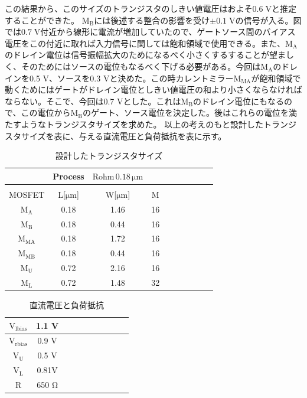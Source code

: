 \documentclass[twocolumn]{jsarticle}
\begin{document}
    この結果から、このサイズのトランジスタのしきい値電圧はおよそ$0.6\;\mathrm{V}$と推定することができた。
    $\mathrm{M_{B}}$には後述する整合の影響を受け$\pm0.1\;\mathrm{V}$の信号が入る。図では$0.7\;\mathrm{V}$付近から線形に電流が増加していたので、ゲートソース間のバイアス電圧をこの付近に取れば入力信号に関しては飽和領域で使用できる。また、$\mathrm{M_{A}}$のドレイン電位は信号振幅拡大のためになるべく小さくするすることが望ましく、そのためにはソースの電位もなるべく下げる必要がある。今回は$\mathrm{M_{A}}$のドレインを0.5 V、ソースを0.3 Vと決めた。この時カレントミラー$\mathrm{M_{MA}}$が飽和領域で動くためにはゲートがドレイン電位としきい値電圧の和より小さくならなければならない。そこで、今回は0.7 Vとした。これは$\mathrm{M_{B}}$のドレイン電位にもなるので、この電位から$\mathrm{M_{B}}$のゲート、ソース電位を決定した。後はこれらの電位を満たすようなトランジスタサイズを求めた。    以上の考えのもと設計したトランジスタサイズを表に、与える直流電圧と負荷抵抗を表に示す。
    \begin{table}[H]
    \caption{設計したトランジスタサイズ}
    \label{table:size}
    \centering
    \begin{tabular}{cccccccccc}
        \hline
        &Process&$\mathrm{Rohm\,0.18\,\mu m}$&\\
        \hline
        &&&\\
        MOSFET & L[$\mathrm{\mu m}$] & W[$\mathrm{\mu m}$] & M\\
        \hline \hline
        $\mathrm{M_{A}}$ & 0.18 & 1.46 & 16 \\
        $\mathrm{M_{B}}$ & 0.18 & 0.44 & 16 \\
        $\mathrm{M_{MA}}$& 0.18 & 1.72 & 16 \\
        $\mathrm{M_{MB}}$& 0.18 & 0.44 & 16 \\
        $\mathrm{M_{U}}$ & 0.72 & 2.16 & 16 \\
        $\mathrm{M_{L}}$ & 0.72 & 1.48 & 32 \\            
    \end{tabular}
    \end{table}
    \begin{table}[H]
    \caption{直流電圧と負荷抵抗}
    \label{table:bias}
    \centering
    \begin{tabular}{cccccccccc}
        $\mathrm{V_{lbias}}$ & 1.1 V\\\hline
        $\mathrm{V_{rbias}}$ & 0.9 V \\\hline
        $\mathrm{V_{U}}$     & 0.5 V  \\\hline
        $\mathrm{V_{L}}$     & 0.81V  \\\hline
        $\mathrm{R}$         & 650 $\mathrm{\Omega}$  
            \end{tabular}
    \end{table}
\end{document}
